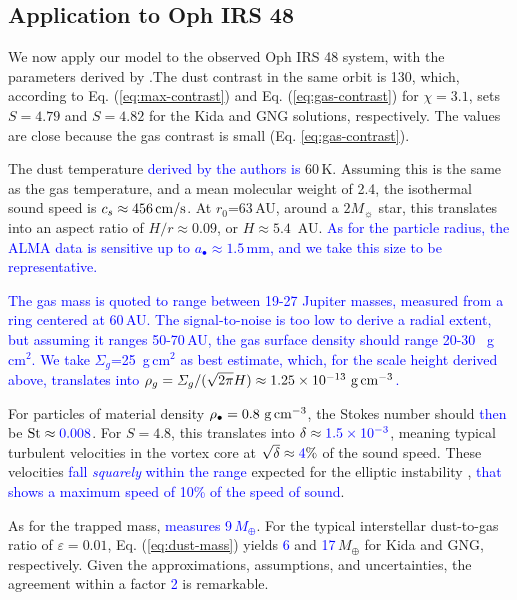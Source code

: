 \documentclass[apj]{emulateapj}
\def\blue#1{\textcolor{blue}{ #1}}
\newcommand{\Eq}[1]{Eq. (\ref{#1})}
\newcommand{\eq}[1]{\Eq{#1}}
\newcommand{\eqp}[1]{(Eq. \ref{#1})}
\newcommand{\St}{{\rm St}}
\begin{document}


\subsection{Application to Oph IRS 48}
\label{sect:oph-irs-48}

We now apply our model to the observed Oph IRS 48 system, with the
parameters derived by \cite{vanderMarel13}.The dust contrast in the same orbit is 130, which, according to
\eq{eq:max-contrast} and \eq{eq:gas-contrast} for $\chi=3.1$, sets $S=4.79$ and
$S=4.82$ for the Kida and GNG solutions, respectively.  The values are
close because the gas contrast is small \eqp{eq:gas-contrast}.

The dust temperature \blue{derived by the authors is} 60\,K. Assuming this is the
  same as the gas temperature, and a mean molecular weight of 2.4, the isothermal sound speed is 
  $c_s \approx {\rm 456 \, cm/s}$. At $r_0$=63\,AU, around a $2 M_\sun$ star, this translates into an aspect
  ratio of $H/r \approx0.09$, or $H\approx5.4$ \,AU. \blue{As for the
    particle radius, the ALMA data is sensitive up to $a_\bullet\approx1.5$\,mm, and we
    take this size to be representative.} 

\blue{The gas mass is quoted to range between 19-27 Jupiter masses,
  measured from a ring centered at 60\,AU. The signal-to-noise is too
  low to derive a radial extent, but assuming it ranges 50-70\,AU, the
  gas surface density should range 20-30 \ g\,cm$^2$. We take
  $\varSigma_g$=25\ g\,cm$^2$ as best estimate, which, for the scale
  height derived above, translates into $\rho_g=\varSigma_g/(\sqrt{2\pi}H)
  \approx 1.25\times 10^{-13}\ {\rm g\,cm}^{-3}$.}

For particles of material density $\rho_\bullet=0.8 \ {\rm g\,cm}^{-3}$, the
Stokes number should \blue{then} be $\St \approx \blue{0.008}$. For $S=4.8$, this translates
into $\delta \approx \blue{1.5\times10^{-3}}$, meaning typical turbulent velocities in the
vortex core at $\sqrt{\delta} \approx \blue{4}\%$ of the sound
speed. These velocities \blue{fall {\it squarely} within the range} expected for the
  elliptic instability \citep{Lesur-Papaloizou10,Lyra-Klahr11},
  \blue{that shows a maximum speed of 10\% of the speed of sound}.

As for the trapped mass, \blue{\citet{vanderMarel13} measures
  9\,$M_\oplus$}. For the typical interstellar
dust-to-gas ratio of $\varepsilon=0.01$, \eq{eq:dust-mass} yields \blue{6} 
and \blue{17}\,$M_\oplus$ for Kida and GNG, respectively. Given the
approximations, assumptions, and uncertainties, the agreement within a
factor \blue{2} is remarkable.
\end{document}

